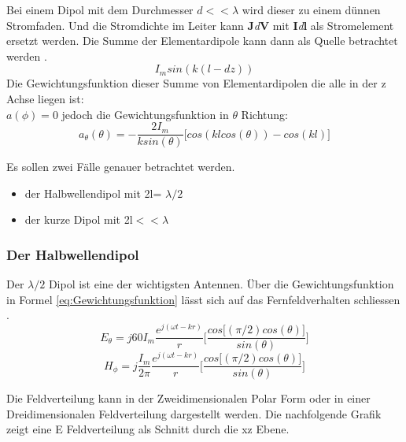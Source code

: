 Bei einem Dipol mit dem Durchmesser $d<<\lambda$ wird dieser zu einem dünnen Stromfaden. Und die Stromdichte im Leiter kann \textbf{J}\textit{d}\textbf{\textbf{V}} mit \textbf{I}\textit{d}\textbf{\textbf{l}} als Stromelement ersetzt werden. Die Summe der Elementardipole kann dann als Quelle betrachtet werden \cite{elliott1981antenna}.\\

\begin{equation}
I_{m}sin(k(l-dz))
\end{equation}
Die Gewichtungsfunktion dieser Summe von Elementardipolen die alle in der z Achse liegen ist:\\
$a(\phi)= 0$
jedoch die Gewichtungsfunktion in $\theta$ Richtung:
\begin{equation}\label{eq:Gewichtungsfunktion}
a_{\theta}(\theta)=- \frac{2I_{m}}{k sin(\theta)} \lbrack cos(kl cos(\theta)) - cos(kl) \rbrack
\end{equation}

Es sollen zwei Fälle genauer betrachtet werden.
\begin{itemize}
\item der Halbwellendipol mit 2l= $\lambda/2$
\item der kurze Dipol mit 2l$<<\lambda$
\end{itemize}
\subsubsection{Der Halbwellendipol}
Der $\lambda/2$ Dipol ist eine der wichtigsten Antennen. Über die Gewichtungsfunktion in Formel \ref{eq:Gewichtungsfunktion} lässt sich auf das Fernfeldverhalten schliessen \cite{elliott1981antenna}.
\begin{equation}
E_{\theta}=j60I_{m} \frac{e^{j(\omega t - kr)}}{r} \lbrack \frac{cos\lbrack  (\pi/2) cos(\theta)\rbrack}{sin(\theta)} \rbrack
\end{equation}
\begin{equation}
H_{\phi}=j \frac{I_{m}}{2\pi} \frac{e^{j(\omega t - kr)}}{r} \lbrack \frac{cos\lbrack  (\pi/2) cos(\theta)\rbrack}{sin(\theta)} \rbrack
\end{equation}

Die Feldverteilung kann in der  Zweidimensionalen Polar Form oder in einer Dreidimensionalen Feldverteilung dargestellt werden.
Die nachfolgende Grafik zeigt eine E Feldverteilung als Schnitt durch die xz Ebene.\\

